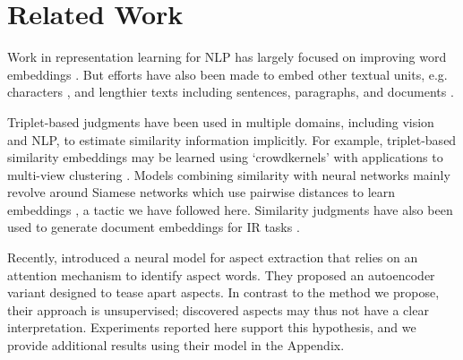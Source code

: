 \documentclass[11pt,a4paper]{article}
\begin{document}
\section{Related Work}
\vspace{-.5em}
\label{section:related-work}

Work in representation learning for NLP has largely focused on improving word embeddings \cite{levy2014dependency,faruqui2014retrofitting,huang2012improving}. But efforts have also been made to embed other textual units, e.g. characters \cite{kim2016character}, and lengthier texts including sentences, paragraphs, and documents \cite{le2014distributed,kiros2015skip}. 

Triplet-based judgments have been used in multiple domains, including vision and NLP, to estimate similarity information implicitly. For example, triplet-based similarity embeddings may be learned using `crowdkernels' with applications to multi-view clustering \cite{amid2015multiview}. Models combining similarity with neural networks mainly revolve around Siamese networks \cite{chopra2005learning} which use pairwise distances to learn embeddings \cite{schroff2015facenet}, a tactic we have followed here. Similarity judgments have also been used to generate document embeddings for IR tasks \cite{shen2014latent,das2016together}.%

Recently,  introduced a neural model for aspect extraction that relies on an attention mechanism to identify aspect words. They proposed an autoencoder variant designed to tease apart aspects. In contrast to the method we propose, their approach is unsupervised; discovered aspects may thus not have a clear interpretation. Experiments reported here support this hypothesis, and we provide additional results using their model in the Appendix. 



\end{document}
